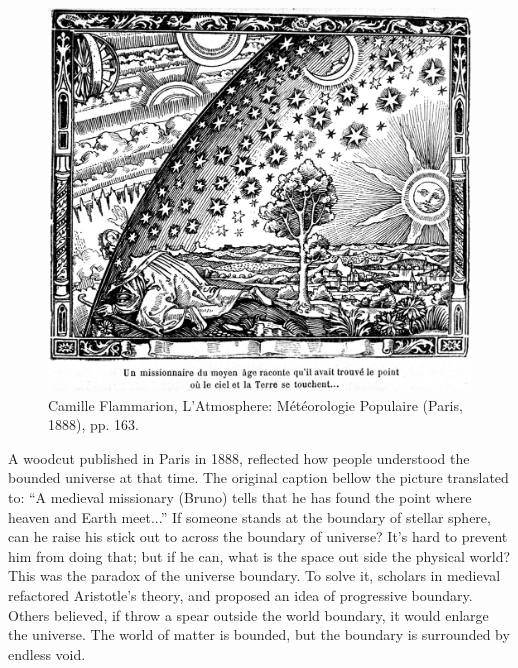 \documentclass{article}
\begin{document}
\begin{figure}[htbp]
 \centering
 \includegraphics[scale=0.3]{img/Flammarion.jpg}
 \captionsetup{labelformat=empty}
 \caption{Camille Flammarion, L'Atmosphere: Météorologie Populaire (Paris, 1888), pp. 163.}
 \label{fig:Flamarion-woodcut}
\end{figure}




A woodcut published in Paris in 1888, reflected how people understood the bounded universe at that time. The original caption bellow the picture translated to: ``A medieval missionary (Bruno) tells that he has found the point where heaven and Earth meet...'' If someone stands at the boundary of stellar sphere, can he raise his stick out to across the boundary of universe? It's hard to prevent him from doing that; but if he can, what is the space out side the physical world? This was the paradox of the universe boundary. To solve it, scholars in medieval refactored Aristotle's theory, and proposed an idea of progressive boundary. Others believed, if throw a spear outside the world boundary, it would enlarge the universe. The world of matter is bounded, but the boundary is surrounded by endless void.
\end{document}

